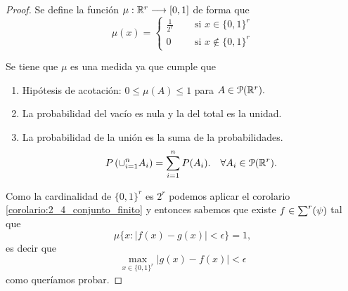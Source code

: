 \begin{proof}
    Se define la función $\mu : \mathbb{R}^r \longrightarrow [0,1]$ de forma que 
    \begin{equation}
        \mu(x) = 
      \left \{
    \begin{aligned}
      \frac{1}{2^r} \quad &\text{ si } x \in \{0,1\}^r \\
      0 \quad & \text{ si } x \notin \{0,1\}^r 
    \end{aligned}
  \right .
    \end{equation}

    Se tiene que $\mu$ es una medida ya que cumple que 
    \begin{enumerate}
        \item Hipótesis de acotación: $0 \leq \mu(A) \leq 1$ para $A \in \mathcal{P}(\mathbb{R}^r).$
        \item La probabilidad del vacío es nula y la del  total es la unidad. 
        \item La probabilidad de la unión es la suma de la probabilidades. 
        \begin{equation}
            P\left(
                \cup_{i=1}^n A_i
            \right)
            = \sum_{i=1}^n P(A_i).
            \quad
            \forall A_i \in  \mathcal{P}(\mathbb{R}^r).
        \end{equation}
    \end{enumerate}  

    Como la cardinalidad de $\{0,1\}^r$ es $2^r$
    podemos aplicar el corolario \ref{corolario:2_4_conjunto_finito}
    y entonces sabemos que  existe $f\in \sum^r (\psi)$ tal que 
    \begin{equation}
            \mu\{ 
                x:
                |f(x) - g(x)| 
                < \epsilon
            \}
            = 1,
    \end{equation} 
    es decir que 
    \begin{equation}
        \max_{x \in \{ 0,1\}^r} |g(x) - f(x)|
        < \epsilon
    \end{equation}
    como queríamos probar. 
\end{proof}

